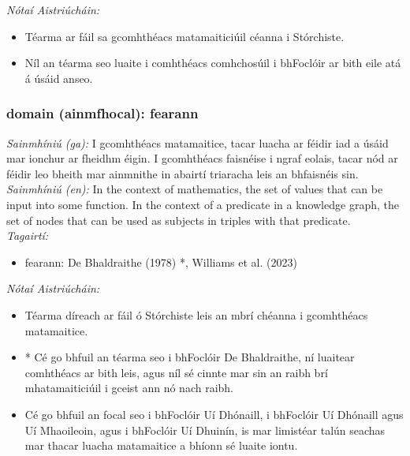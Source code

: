  \noindent \textit{Nótaí Aistriúcháin:}
\begin{itemize}
	\item Téarma ar fáil sa gcomhthéacs matamaiticiúil céanna i Stórchiste.
	\item Níl an téarma seo luaite i comhthéacs comhchosúil i bhFoclóir ar bith eile atá á úsáid anseo.
\end{itemize}


\subsubsection*{domain (ainmfhocal): fearann}
 \noindent \textit{Sainmhíniú (ga):} I gcomhthéacs matamaitice, tacar luacha ar féidir iad a úsáid mar ionchur ar fheidhm éigin. I gcomhthéacs faisnéise i ngraf eolais, tacar nód ar féidir leo bheith mar ainmnithe in abairtí triaracha leis an bhfaisnéis sin.
\\
 \noindent \textit{Sainmhíniú (en):} In the context of mathematics, the set of values that can be input into some function. In the context of a predicate in a knowledge graph, the set of nodes that can be used as subjects in triples with that predicate.
\\
 \noindent \textit{Tagairtí:}
\begin{itemize}
	\item fearann: De Bhaldraithe (1978) \cite{de-bhaldraithe}*, Williams et al. (2023) \cite{storchiste}
\end{itemize}

 \noindent \textit{Nótaí Aistriúcháin:}
\begin{itemize}
	\item Téarma díreach ar fáil ó Stórchiste leis an mbrí chéanna i gcomhthéacs matamaitice.
	\item * Cé go bhfuil an téarma seo i bhFoclóir De Bhaldraithe, ní luaitear comhthéacs ar bith leis, agus níl sé cinnte mar sin an raibh brí mhatamaiticiúil i gceist ann nó nach raibh.
	\item Cé go bhfuil an focal seo i bhFoclóir Uí Dhónaill, i bhFoclóir Uí Dhónaill agus Uí Mhaoileoin, agus i bhFoclóir Uí Dhuinín, is mar limistéar talún seachas mar thacar luacha matamaitice a bhíonn sé luaite iontu.
\end{itemize}


